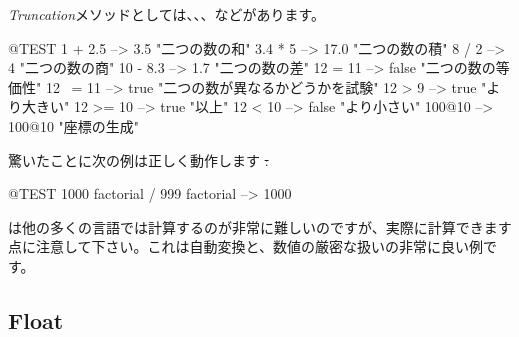 \documentclass[a4paper,10pt,twoside]{book}
\begin{document}
\emph{Truncation}メソッドとしては、、、などがあります。

\begin{code}{@TEST}
1 + 2.5     --> 3.5             "二つの数の和"
3.4 * 5      --> 17.0           "二つの数の積"
8 / 2         --> 4                 "二つの数の商"
10 - 8.3   --> 1.7              "二つの数の差"
12 = 11    --> false           "二つの数の等価性"
12 ~= 11 --> true            "二つの数が異なるかどうかを試験"
12 > 9      --> true            "より大きい"
12 >= 10  --> true            "以上"
12 < 10    --> false           "より小さい"
100@10   --> 100@10    "座標の生成"
\end{code}

驚いたことに次の例は正しく動作します \st:
\begin{code}{@TEST}
1000 factorial / 999 factorial --> 1000
\end{code}
は他の多くの言語では計算するのが非常に難しいのですが、実際に計算できます点に注意して下さい。これは自動変換と、数値の厳密な扱いの非常に良い例です。


\subsection{Float}
\end{document}
